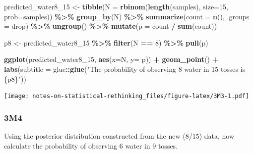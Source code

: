 \documentclass[
]{book}
\newenvironment{Shaded}{\begin{snugshade}}{\end{snugshade}}
\newcommand{\DataTypeTok}[1]{\textcolor[rgb]{0.13,0.29,0.53}{#1}}
\newcommand{\DecValTok}[1]{\textcolor[rgb]{0.00,0.00,0.81}{#1}}
\newcommand{\KeywordTok}[1]{\textcolor[rgb]{0.13,0.29,0.53}{\textbf{#1}}}
\newcommand{\NormalTok}[1]{#1}
\newcommand{\OperatorTok}[1]{\textcolor[rgb]{0.81,0.36,0.00}{\textbf{#1}}}
\newcommand{\StringTok}[1]{\textcolor[rgb]{0.31,0.60,0.02}{#1}}
\begin{document}
\begin{Shaded}
\begin{Highlighting}[]
\NormalTok{predicted\_water8\_}\DecValTok{15}\NormalTok{ \textless{}{-}}\StringTok{ }
\StringTok{  }\KeywordTok{tibble}\NormalTok{(}\DataTypeTok{N =} \KeywordTok{rbinom}\NormalTok{(}\KeywordTok{length}\NormalTok{(samples), }\DataTypeTok{size=}\DecValTok{15}\NormalTok{, }\DataTypeTok{prob=}\NormalTok{samples)) }\OperatorTok{\%\textgreater{}\%}
\StringTok{  }\KeywordTok{group\_by}\NormalTok{(N) }\OperatorTok{\%\textgreater{}\%}
\StringTok{  }\KeywordTok{summarize}\NormalTok{(}\DataTypeTok{count =} \KeywordTok{n}\NormalTok{(), }\DataTypeTok{.groups =} \StringTok{\textquotesingle{}drop\textquotesingle{}}\NormalTok{)  }\OperatorTok{\%\textgreater{}\%}
\StringTok{  }\KeywordTok{ungroup}\NormalTok{() }\OperatorTok{\%\textgreater{}\%}
\StringTok{  }\KeywordTok{mutate}\NormalTok{(}\DataTypeTok{p =}\NormalTok{ count }\OperatorTok{/}\StringTok{ }\KeywordTok{sum}\NormalTok{(count))}
  
\NormalTok{p8 \textless{}{-}}\StringTok{ }
\StringTok{  }\NormalTok{predicted\_water8\_}\DecValTok{15} \OperatorTok{\%\textgreater{}\%}
\StringTok{  }\KeywordTok{filter}\NormalTok{(N }\OperatorTok{==}\StringTok{ }\DecValTok{8}\NormalTok{) }\OperatorTok{\%\textgreater{}\%}
\StringTok{  }\KeywordTok{pull}\NormalTok{(p)}

\KeywordTok{ggplot}\NormalTok{(predicted\_water8\_}\DecValTok{15}\NormalTok{, }\KeywordTok{aes}\NormalTok{(}\DataTypeTok{x=}\NormalTok{N, }\DataTypeTok{y=}\NormalTok{ p)) }\OperatorTok{+}\StringTok{ }
\StringTok{    }\KeywordTok{geom\_point}\NormalTok{() }\OperatorTok{+}\StringTok{ }
\StringTok{  }\KeywordTok{labs}\NormalTok{(}\DataTypeTok{subtitle =}\NormalTok{ glue}\OperatorTok{::}\KeywordTok{glue}\NormalTok{(}\StringTok{"The probability of observing 8 water in 15 tosses is \{p8\}"}\NormalTok{))}
\end{Highlighting}
\end{Shaded}

\texttt{[image: notes-on-statistical-rethinking\_files/figure-latex/3M3-1.pdf]}

\hypertarget{m4-1}{%
\subsubsection*{3M4}\label{m4-1}}

Using the posterior distribution constructed from the new (8/15) data, now calculate the probability of observing 6 water in 9 tosses.
\end{document}
